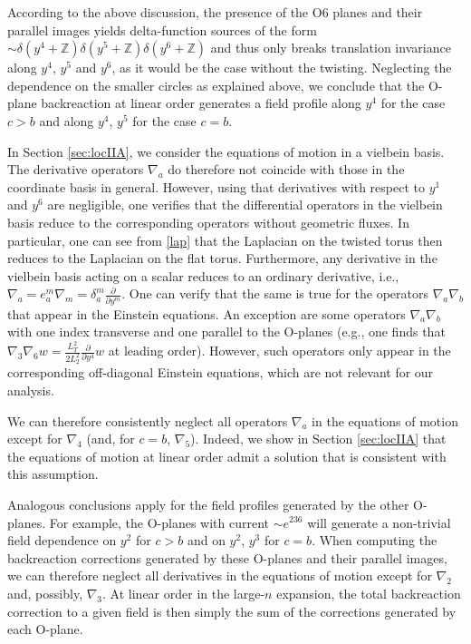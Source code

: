\documentclass[11pt]{article}
\renewcommand{\[}{\left[}
\renewcommand{\]}{\right]}
\renewcommand{\(}{\left(}
\renewcommand{\)}{\right)}
\newcommand{\<}{\langle}
\renewcommand{\>}{\rangle}
\begin{document}
According to the above discussion, the presence of the O6 planes and their parallel images yields delta-function sources of the form $\sim \delta(y^4+\mathbb{Z})\delta(y^5+\mathbb{Z})\delta(y^6+\mathbb{Z})$ and thus only breaks translation invariance along $y^4$, $y^5$ and $y^6$, as it would be the case without the twisting. Neglecting the dependence on the smaller circles as explained above, we conclude that the O-plane backreaction at linear order generates a field profile along $y^4$ for the case $c>b$ and along $y^4$, $y^5$ for the case $c=b$.

In Section \ref{sec:locIIA}, we consider the equations of motion in a vielbein basis. The derivative operators $\nabla_a$ do therefore not coincide with those in the coordinate basis in general. However, using that derivatives with respect to $y^1$ and $y^6$ are negligible, one verifies that the differential operators in the vielbein basis reduce to the corresponding operators without geometric fluxes. In particular,
one can see from \eqref{lap} that the Laplacian on the twisted torus then reduces to the Laplacian on the flat torus. Furthermore, any derivative in the vielbein basis acting on a scalar reduces to an ordinary derivative, i.e., $\nabla_a = e^m_a\nabla_m=\delta^m_a\frac{\partial}{\partial y^m}$. One can verify that the same is true for the operators $\nabla_a\nabla_b$ that appear in the Einstein equations. An exception are some operators $\nabla_a\nabla_b$ with one index transverse and one parallel to the O-planes (e.g., one finds that $\nabla_3\nabla_6 w = \frac{L_T^2}{2L_2^2} \frac{\partial}{\partial y^4} w$ at leading order). However, such operators only appear in the corresponding off-diagonal Einstein equations, which are not relevant for our analysis.

We can therefore consistently neglect all operators $\nabla_a$ in the equations of motion except for $\nabla_4$ (and, for $c=b$, $\nabla_5$).
Indeed, we show in Section \ref{sec:locIIA} that the equations of motion at linear order admit a solution that is consistent with this assumption.

Analogous conclusions apply for the field profiles generated by the other O-planes. For example, the O-planes with current $ \sim e^{236}$ will generate a non-trivial field dependence on $y^2$ for $c>b$ and on $y^2$, $y^3$ for $c=b$. When computing the backreaction corrections generated by these O-planes and their parallel images, we can therefore neglect all derivatives in the equations of motion except for $\nabla_2$ and, possibly, $\nabla_3$. At linear order in the large-$n$ expansion, the total backreaction correction to a given field is then simply the sum of the corrections generated by each O-plane.




\end{document}
